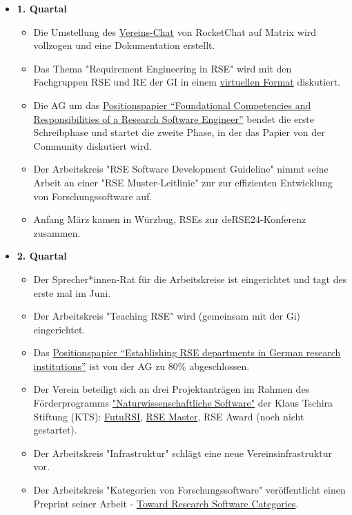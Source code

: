 \begin{itemize}
 \item[] \textbf{1. Quartal}
   \begin{itemize}
     \item Die Umstellung des \href{https://de-rse.org/de/matrix.html}{Vereins-Chat} von RocketChat auf Matrix wird vollzogen und eine Dokumentation erstellt.
     \item Das Thema "Requirement Engineering in RSE" wird mit den Fachgruppen RSE und RE der GI in einem \href{https://fg-re.gi.de/veranstaltung/event-re-and-rse}{virtuellen Format} diskutiert.
     \item Die AG um das \href{https://doi.org/10.12688/f1000research.157778.2}{Positionspapier “Foundational Competencies and Responsibilities of a Research Software Engineer”} bendet die erste Schreibphase und startet die zweite Phase, in der das Papier von der Community diskutiert wird. 
     \item Der Arbeitskreis "RSE Software Development Guideline" nimmt seine Arbeit an einer "RSE Muster-Leitlinie" zur zur effizienten Entwicklung von Forschungssoftware auf.
     \item Anfang März kamen in Würzbug,  RSEs zur deRSE24-Konferenz zusammen.
  
   \end{itemize}\clearpage
 \item[] \textbf{2. Quartal}
   \begin{itemize}
    \item Der Sprecher*innen-Rat für die Arbeitskreise ist eingerichtet und tagt des erste mal im Juni.
    \item Der Arbeitskreis "Teaching RSE" wird (gemeinsam mit der Gi) eingerichtet.
    \item Das \href{https://github.com/DE-RSE/2023_paper-RSE-groups}{Positionspapier “Establishing RSE departments in German research institutions”} ist von der AG zu 80\% abgeschlossen.
    \item Der Verein beteiligt sich an drei Projektanträgen im Rahmen des Förderprogramms \href{https://klaus-tschira-stiftung.de/foerderungen/naturwissenschaftliche-software/}{"Naturwissenschaftliche Software"} der Klaus Tschira Stiftung (KTS): \href{https://www.futursi.de/}{FutuRSI}, \href{https://the-teachingrse-project.github.io/RSE-Masters/}{RSE Master}, RSE Award (noch nicht gestartet).
    \item Der Arbeitskreis "Infrastruktur" schlägt eine neue Vereinsinfrastruktur vor.
    \item Der Arbeitskreis "Kategorien von Forschungssoftware" veröffentlicht einen Preprint seiner Arbeit - \href{https://arxiv.org/abs/2404.14364}{Toward Research Software Categories}.
     

\end{itemize}
\end{itemize}
